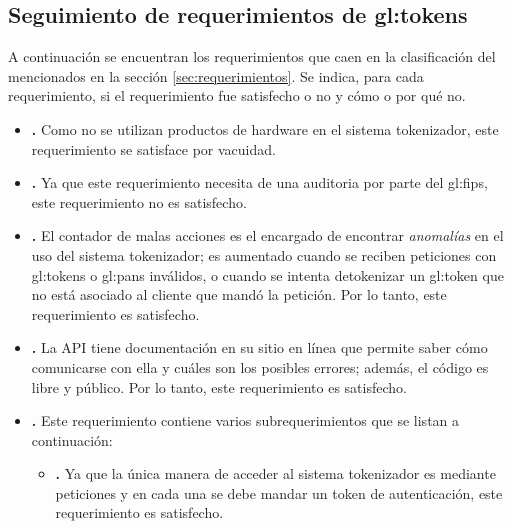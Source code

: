 %
%

\subsection{Seguimiento de requerimientos de \glspl{gl:token}}
\label{sec:seguimiento_api}

A continuación se encuentran los requerimientos que caen en la clasificación
del  mencionados en la sección
\ref{sec:requerimientos}. Se indica, para cada requerimiento, si el
requerimiento fue satisfecho o no y cómo o por qué no.

\begin{itemize}
  \item \textbf{.}
    Como no se utilizan productos de hardware en el sistema tokenizador, este
    requerimiento se satisface por vacuidad.

  \item \textbf{.}
    Ya que este requerimiento necesita de una auditoria por parte del
    \gls{gl:fips}, este requerimiento no es satisfecho.

  \item \textbf{.}
    El contador de malas acciones es el encargado de encontrar
    \textit{anomalías} en el uso del sistema tokenizador; es aumentado cuando
    se reciben peticiones con \glspl{gl:token} o \glspl{gl:pan} inválidos, o
    cuando se intenta detokenizar un \gls{gl:token} que no está asociado
    al cliente que mandó la petición. Por lo tanto, este requerimiento es
    satisfecho.

  \item \textbf{.}
    La API tiene documentación en su sitio en línea que permite saber cómo
    comunicarse con ella y cuáles son los posibles errores; además, el código
    es libre y público. Por lo tanto, este requerimiento es satisfecho.

  \item \textbf{.}
    Este requerimiento contiene varios subrequerimientos que se listan
    a continuación:
    \begin{itemize}
      \item \textbf{.}
        Ya que la única manera de acceder al sistema tokenizador es mediante
        peticiones y en cada una se debe mandar un token de autenticación,
        este requerimiento es satisfecho.


\end{itemize}
\end{itemize}

